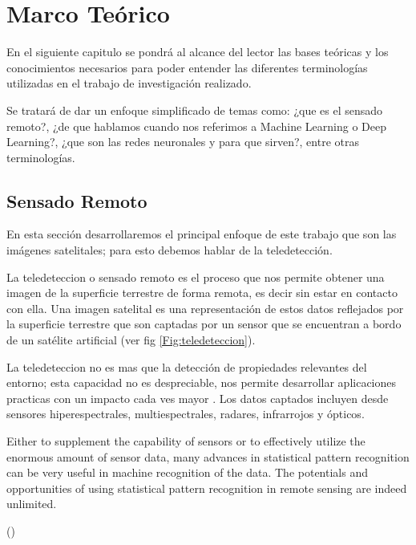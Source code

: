 \chapter{Marco Teórico} \label{chap:marcoteorico}

En el siguiente capitulo se pondrá al alcance del lector las bases teóricas y los conocimientos necesarios para poder entender las diferentes terminologías utilizadas en el trabajo de investigación realizado.

Se tratará de dar un enfoque simplificado de temas como: ¿que es el sensado remoto?, ¿de que hablamos cuando nos referimos a Machine Learning o Deep Learning?, ¿que son las redes neuronales y para que sirven?, entre otras terminologías.

\section{Sensado Remoto}\label{sec:sensadoremoto}

En esta sección desarrollaremos el principal enfoque de este trabajo que son las imágenes satelitales; para esto debemos hablar de la teledetección.

La teledeteccion o sensado remoto es el proceso que nos permite obtener una imagen de la superficie terrestre de forma remota, es decir sin estar en contacto con ella. Una imagen satelital es una representación de estos datos reflejados por la superficie terrestre que son captadas por un sensor que se encuentran a bordo de un satélite artificial (ver fig \ref{Fig:teledeteccion}).

La teledeteccion no es mas que la detección de propiedades relevantes del entorno; esta capacidad no es despreciable, nos permite desarrollar aplicaciones practicas con un impacto cada ves mayor \citep{percepcion}. Los datos captados incluyen desde sensores hiperespectrales, multiespectrales, radares, infrarrojos y ópticos.

\begin{center} \begin{minipage}{0.8\linewidth}  \vspace{5pt} {\small
Either to supplement the capability of sensors or to effectively utilize the enormous amount of sensor data, many advances in statistical pattern recognition can be very useful in machine recognition of the data. The potentials and opportunities of using statistical pattern recognition in remote sensing are indeed unlimited.}
\begin{flushright} (\citeauthor{Ledda})
\end{flushright}
\end{minipage}
\end{center}

